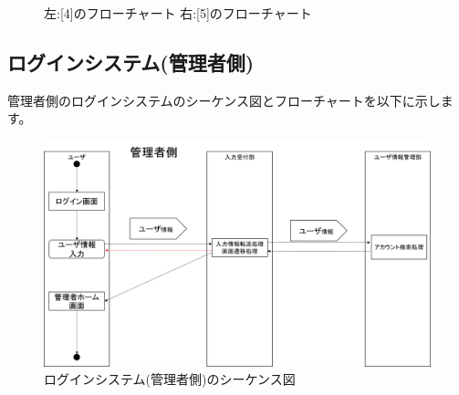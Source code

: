 \begin{figure}[htbp]
\begin{minipage}{0.5\hsize}
\begin{center}
  \end{center}
 \end{minipage}
 \caption{左:[4]のフローチャート 右:[5]のフローチャート}\label{fig:loginflow2}
\end{figure}

\newpage

\subsection{ログインシステム(管理者側)}
管理者側のログインシステムのシーケンス図とフローチャートを以下に示します。

\begin{figure}[htbp]
  \begin{center}
    \includegraphics[width=1\linewidth,clip]{./img/admin_login/main.png}
    \caption{ログインシステム(管理者側)のシーケンス図}\label{fig:adminloginseaquence}
  \end{center}
\end{figure}


